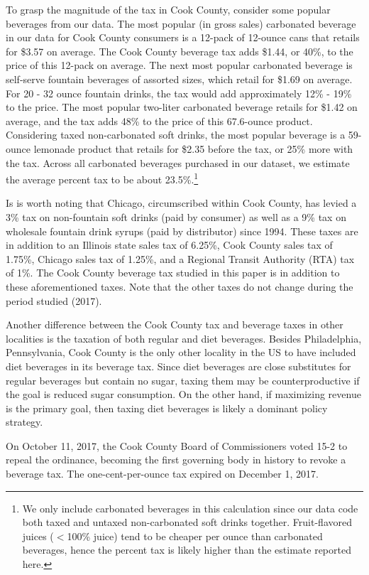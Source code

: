 \documentclass[12pt]{article}
\begin{document}
To grasp the magnitude of the tax in Cook County, consider some popular beverages from our data. The most popular (in gross sales) carbonated beverage in our data for Cook County consumers is a 12-pack of 12-ounce cans that retails for \$3.57 on average. The Cook County beverage tax adds \$1.44, or 40\%, to the price of this 12-pack on average. The next most popular carbonated beverage is self-serve fountain beverages of assorted sizes, which retail for \$1.69 on average. For 20 - 32 ounce fountain drinks, the tax would add approximately 12\% - 19\% to the price. The most popular two-liter carbonated beverage retails for \$1.42 on average, and the tax adds 48\% to the price of this 67.6-ounce product. Considering taxed non-carbonated soft drinks, the most popular beverage is a 59-ounce lemonade product that retails for \$2.35 before the tax, or 25\% more with the tax. Across all carbonated beverages purchased in our dataset, we estimate the average percent tax to be about 23.5\%.\footnote{We only include carbonated beverages in this calculation since our data code both taxed and untaxed non-carbonated soft drinks together. Fruit-flavored juices ($<$100\% juice) tend to be cheaper per ounce than carbonated beverages, hence the percent tax is likely higher than the estimate reported here.}

Is is worth noting that Chicago, circumscribed within Cook County, has levied a 3\% tax on non-fountain soft drinks (paid by consumer) as well as a 9\% tax on wholesale fountain drink syrups (paid by distributor) since 1994. These taxes are in addition to an Illinois state sales tax of 6.25\%, Cook County sales tax of 1.75\%, Chicago sales tax of 1.25\%, and a Regional Transit Authority (RTA) tax of 1\%. The Cook County beverage tax studied in this paper is in addition to these aforementioned taxes. Note that the other taxes do not change during the period studied (2017).

Another difference between the Cook County tax and beverage taxes in other localities is the taxation of both regular and diet beverages. Besides Philadelphia, Pennsylvania, Cook County is the only other locality in the US to have included diet beverages in its beverage tax. Since diet beverages are close substitutes for regular beverages but contain no sugar, taxing them may be counterproductive if the goal is reduced sugar consumption. On the other hand, if maximizing revenue is the primary goal, then taxing diet beverages is likely a dominant policy strategy.

On October 11, 2017, the Cook County Board of Commissioners voted 15-2 to repeal the ordinance, becoming the first governing body in history to revoke a beverage tax. The one-cent-per-ounce tax expired on December 1, 2017.
\end{document}

